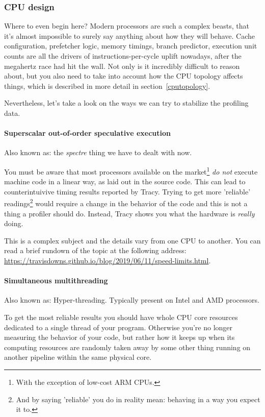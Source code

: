 \documentclass[hidelinks,titlepage,a4paper]{article}
\begin{document}
\subsubsection{CPU design}
\label{checkenvironmentcpu}

Where to even begin here? Modern processors are such a complex beasts, that it's almost impossible to surely say anything about how they will behave. Cache configuration, prefetcher logic, memory timings, branch predictor, execution unit counts are all the drivers of instructions-per-cycle uplift nowadays, after the megahertz race had hit the wall. Not only is it incredibly difficult to reason about, but you also need to take into account how the CPU topology affects things, which is described in more detail in section~\ref{cputopology}.

Nevertheless, let's take a look on the ways we can try to stabilize the profiling data.

\paragraph{Superscalar out-of-order speculative execution}

Also known as: the \emph{spectre} thing we have to dealt with now.

You must be aware that most processors available on the market\footnote{With the exception of low-cost ARM CPUs.} \emph{do not} execute machine code in a linear way, as laid out in the source code. This can lead to counterintuivive timing results reported by Tracy. Trying to get more 'reliable' readings\footnote{And by saying 'reliable' you do in reality mean: behaving in a way you expect it to.} would require a change in the behavior of the code and this is not a thing a profiler should do. Instead, Tracy shows you what the hardware is \emph{really} doing.

This is a complex subject and the details vary from one CPU to another. You can read a brief rundown of the topic at the following address: \url{https://travisdowns.github.io/blog/2019/06/11/speed-limits.html}.

\paragraph{Simultaneous multithreading}

Also known as: Hyper-threading. Typically present on Intel and AMD processors.

To get the most reliable results you should have whole CPU core resources dedicated to a single thread of your program. Otherwise you're no longer measuring the behavior of your code, but rather how it keeps up when its computing resources are randomly taken away by some other thing running on another pipeline within the same physical core.
\end{document}
